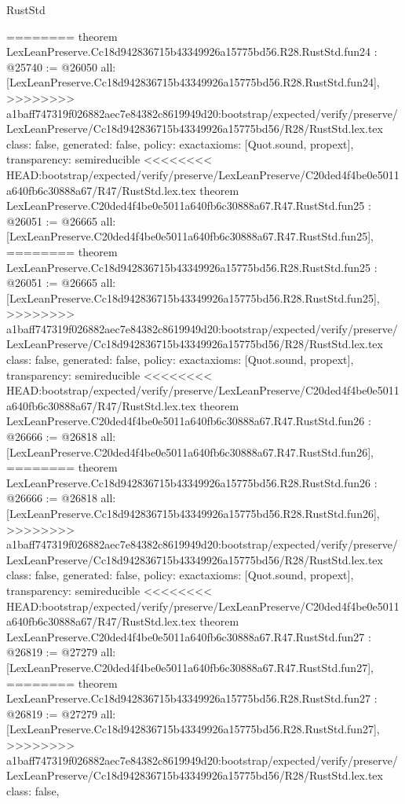 \begin{lexlean}{RustStd}
\begin{coremodule}
{\begin{coremodule}
{{{{{{{{{{{{{{{{{{{{{{{{{{{========
theorem LexLeanPreserve.Cc18d942836715b43349926a15775bd56.R28.RustStd.fun24 : @25740 := @26050 {
  all: [LexLeanPreserve.Cc18d942836715b43349926a15775bd56.R28.RustStd.fun24],
>>>>>>>> a1baff747319f026882aec7e84382c8619949d20:bootstrap/expected/verify/preserve/LexLeanPreserve/Cc18d942836715b43349926a15775bd56/R28/RustStd.lex.tex
  class: false,
  generated: false,
  policy: exact{axioms: [Quot.sound, propext]},
  transparency: semireducible
}
<<<<<<<< HEAD:bootstrap/expected/verify/preserve/LexLeanPreserve/C20ded4f4be0e5011a640fb6c30888a67/R47/RustStd.lex.tex
theorem LexLeanPreserve.C20ded4f4be0e5011a640fb6c30888a67.R47.RustStd.fun25 : @26051 := @26665 {
  all: [LexLeanPreserve.C20ded4f4be0e5011a640fb6c30888a67.R47.RustStd.fun25],
========
theorem LexLeanPreserve.Cc18d942836715b43349926a15775bd56.R28.RustStd.fun25 : @26051 := @26665 {
  all: [LexLeanPreserve.Cc18d942836715b43349926a15775bd56.R28.RustStd.fun25],
>>>>>>>> a1baff747319f026882aec7e84382c8619949d20:bootstrap/expected/verify/preserve/LexLeanPreserve/Cc18d942836715b43349926a15775bd56/R28/RustStd.lex.tex
  class: false,
  generated: false,
  policy: exact{axioms: [Quot.sound, propext]},
  transparency: semireducible
}
<<<<<<<< HEAD:bootstrap/expected/verify/preserve/LexLeanPreserve/C20ded4f4be0e5011a640fb6c30888a67/R47/RustStd.lex.tex
theorem LexLeanPreserve.C20ded4f4be0e5011a640fb6c30888a67.R47.RustStd.fun26 : @26666 := @26818 {
  all: [LexLeanPreserve.C20ded4f4be0e5011a640fb6c30888a67.R47.RustStd.fun26],
========
theorem LexLeanPreserve.Cc18d942836715b43349926a15775bd56.R28.RustStd.fun26 : @26666 := @26818 {
  all: [LexLeanPreserve.Cc18d942836715b43349926a15775bd56.R28.RustStd.fun26],
>>>>>>>> a1baff747319f026882aec7e84382c8619949d20:bootstrap/expected/verify/preserve/LexLeanPreserve/Cc18d942836715b43349926a15775bd56/R28/RustStd.lex.tex
  class: false,
  generated: false,
  policy: exact{axioms: [Quot.sound, propext]},
  transparency: semireducible
}
<<<<<<<< HEAD:bootstrap/expected/verify/preserve/LexLeanPreserve/C20ded4f4be0e5011a640fb6c30888a67/R47/RustStd.lex.tex
theorem LexLeanPreserve.C20ded4f4be0e5011a640fb6c30888a67.R47.RustStd.fun27 : @26819 := @27279 {
  all: [LexLeanPreserve.C20ded4f4be0e5011a640fb6c30888a67.R47.RustStd.fun27],
========
theorem LexLeanPreserve.Cc18d942836715b43349926a15775bd56.R28.RustStd.fun27 : @26819 := @27279 {
  all: [LexLeanPreserve.Cc18d942836715b43349926a15775bd56.R28.RustStd.fun27],
>>>>>>>> a1baff747319f026882aec7e84382c8619949d20:bootstrap/expected/verify/preserve/LexLeanPreserve/Cc18d942836715b43349926a15775bd56/R28/RustStd.lex.tex
  class: false,
}}}}}}}}}}}}}}}}}}}}}}}}}}}}}}}
\end{coremodule}}
\end{coremodule}
\end{lexlean}
